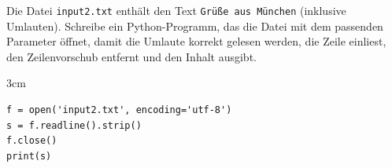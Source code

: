\question[3]
Die Datei \texttt{input2.txt} enthält den Text \texttt{Grüße aus München}
(inklusive Umlauten). Schreibe ein Python-Programm, das die Datei mit dem
passenden Parameter öffnet, damit die Umlaute korrekt gelesen werden, die
Zeile einliest, den Zeilenvorschub entfernt und den Inhalt ausgibt.

\begin{solutionbox}{3cm}
\begin{lstlisting}
f = open('input2.txt', encoding='utf-8')
s = f.readline().strip()
f.close()
print(s)
\end{lstlisting}
\end{solutionbox}